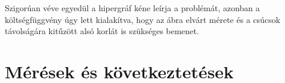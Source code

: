 Szigorúan véve egyedül a hipergráf kéne leírja a problémát, azonban a költségfüggvény úgy lett kialakítva, hogy az ábra elvárt mérete és a csúcsok távolságára kitűzött alsó korlát is szükséges bemenet.



\section{Mérések és következtetések}



